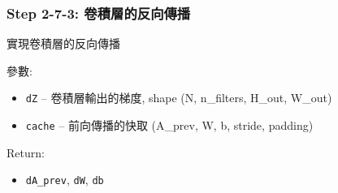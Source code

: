 \documentclass[11pt]{article}
\providecommand{\tightlist}{%
      \setlength{\itemsep}{0pt}\setlength{\parskip}{0pt}}
\begin{document}
    \subsubsection{Step 2-7-3:
卷積層的反向傳播}\label{step-2-7-3-ux5377ux7a4dux5c64ux7684ux53cdux5411ux50b3ux64ad}

實現卷積層的反向傳播

參數:

\begin{itemize}
\tightlist
\item
  \texttt{dZ} -- 卷積層輸出的梯度, shape (N, n\_filters, H\_out, W\_out)
\item
  \texttt{cache} -- 前向傳播的快取 (A\_prev, W, b, stride, padding)
\end{itemize}

Return:

\begin{itemize}
\tightlist
\item
  \texttt{dA\_prev}, \texttt{dW}, \texttt{db}
\end{itemize}
\end{document}
